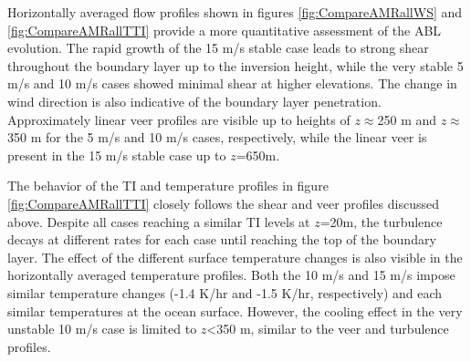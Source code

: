 Horizontally averaged flow profiles shown in figures
\ref{fig:CompareAMRallWS} and \ref{fig:CompareAMRallTTI} provide a
more quantitative assessment of the ABL evolution.  The rapid growth
of the 15 m/s stable case leads to strong shear throughout the
boundary layer up to the inversion height, while the very stable 5 m/s
and 10 m/s cases showed minimal shear at higher elevations.  The
change in wind direction is also indicative of the boundary layer
penetration.  Approximately linear veer profiles are visible up to
heights of $z\approx$250 m and $z\approx$350 m for the 5 m/s and 10
m/s cases, respectively, while the linear veer is present in the 15
m/s stable case up to $z$=650m.

The behavior of the TI and temperature profiles in figure
\ref{fig:CompareAMRallTTI} closely follows the shear and veer profiles
discussed above.  Despite all cases reaching a similar TI levels at
$z$=20m, the turbulence decays at different rates for each case until
reaching the top of the boundary layer.  The effect of the different
surface temperature changes is also visible in the horizontally
averaged temperature profiles.  Both the 10 m/s and 15 m/s impose
similar temperature changes (-1.4 K/hr and -1.5 K/hr, respectively)
and each similar temperatures at the ocean surface.  However, the
cooling effect in the very unstable 10 m/s case is limited to $z$<350
m, similar to the veer and turbulence profiles.

